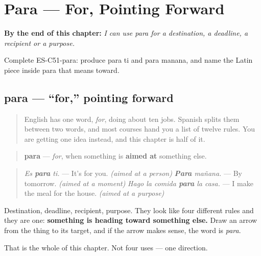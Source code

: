 
\chapter{Para --- For, Pointing Forward}
\label{ch:para}

\begin{chapteropening}
\textbf{By the end of this chapter:} \emph{I can use para for a destination, a deadline, a recipient or a purpose.}

Complete ES-C51-para: produce para ti and para manana, and name the Latin piece inside para that means toward.
\end{chapteropening}

\section[para]{para — \textquotedblleft{}for,\textquotedblright{} pointing forward}

\label{lesson:ES-C51-para}



\begin{quote}
English has one word, \emph{for}, doing about ten jobs. Spanish splits them between two words, and most courses hand you a list of twelve rules. You are getting one idea instead, and this chapter is half of it.
\end{quote}

\begin{grammarlens}[title={Grammar Lens: the arrow points away from you}]
\begin{quote}
\textbf{para} — \emph{for}, when something is \textbf{aimed at} something else.
\end{quote}

\begin{quote}
\emph{Es \textbf{para} ti.} — It's for you. \emph{(aimed at a person)} \emph{\textbf{Para} mañana.} — By tomorrow. \emph{(aimed at a moment)} \emph{Hago la comida \textbf{para} la casa.} — I make the meal for the house. \emph{(aimed at a purpose)}
\end{quote}

Destination, deadline, recipient, purpose. They look like four different rules and they are one: \textbf{something is heading toward something else.} Draw an arrow from the thing to its target, and if the arrow makes sense, the word is \emph{para}.

That is the whole of this chapter. Not four uses — one direction.
\end{grammarlens}

